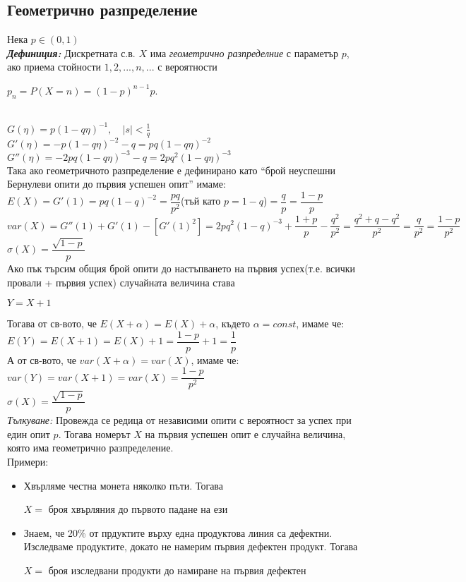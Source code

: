 \documentclass[11pt]{article} %
\newcommand{\italicBold}[1]{\textbf{\emph{#1}}}
\newcommand{\definition}{\italicBold{Дефиниция: }}
\begin{document}
\subsection{Геометрично разпределение}
Нека $p \in (0,1)$\\
\definition Дискретната с.в. $X$ има \textit{геометрично разпределние} с параметър $p$, ако приема стойности $1,2,...,n,...$ с вероятности\\
\centerline{$p_{n}=P(X=n)=(1-p)^{n-1}p$.}\\
$G(\eta)=p(1-q\eta)^{-1}, \quad |s|<\frac{1}{q}$\\
$G'(\eta)=-p(1-q\eta)^{-2}-q=pq(1-q\eta)^{-2}$\\
$G''(\eta)=-2pq(1-q\eta)^{-3}-q=2pq^{2}(1-q\eta)^{-3}$\\
Така ако геометричното разпределение е дефинирано като \enquote{брой неуспешни Бернулеви опити до първия успешен опит} имаме:\\
$E(X)=G'(1)=pq(1-q)^{-2}=\dfrac{pq}{p^{2}}$(тъй като $p=1-q$)$=\dfrac{q}{p}=\dfrac{1-p}{p}$\\
$var(X)=G''(1)+G'(1)-[G'(1)^{2}]=2pq^{2}(1-q)^{-3}+\dfrac{1+p}{p}-\dfrac{q^{2}}{p^{2}}=\dfrac{q^{2}+q-q^{2}}{p^{2}}=\dfrac{q}{p^{2}}=\dfrac{1-p}{p^{2}}$\\
$\sigma(X)=\dfrac{\sqrt{1-p}}{p}$\\

Ако пък търсим общия брой опити до настъпването на първия успех(т.е. всички провали + първия успех) случайната величина става\\
\centerline{$Y=X+1$}
Тогава от св-вото, че $E(X+\alpha)=E(X)+\alpha$, където $\alpha=const$, имаме че:\\
$E(Y)=E(X+1)=E(X)+1=\dfrac{1-p}{p}+1=\dfrac{1}{p}$\\
А от св-вото, че $var(X+\alpha)=var(X)$, имаме че:\\
$var(Y)=var(X+1)=var(X)=\dfrac{1-p}{p^{2}}$\\
$\sigma(X)=\dfrac{\sqrt{1-p}}{p}$\\

\textit{Тълкуване:} Провежда се редица от независими опити с вероятност за успех при един опит $p$. Тогава номерът $X$ на първия успешен опит е случайна величина, която има геометрично разпределение.\\
Примери:
\begin{itemize}
	\item Хвърляме честна монета няколко пъти. Тогава \\
		\centerline{$X=$ броя хвърляния до първото падане на ези}
	\item Знаем, че 20\% от прдуктите върху една продуктова линия са дефектни. Изследваме продуктите, докато не намерим първия дефектен продукт. Тогава \\
		\centerline{$X=$ броя изследвани продукти до намиране на първия дефектен}
\end{itemize}
\end{document}

